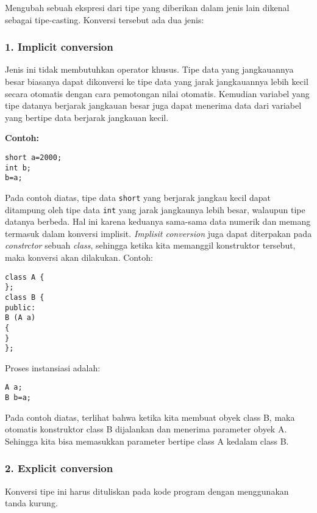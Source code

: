 Mengubah sebuah ekspresi dari tipe yang diberikan dalam jenis lain
dikenal sebagai tipe-casting. Konversi tersebut ada dua jenis:

\subsubsection{1. Implicit conversion}\label{implicit-conversion}

Jenis ini tidak membutuhkan operator khusus. Tipe data yang jangkauannya
besar biasanya dapat dikonversi ke tipe data yang jarak jangkauannya
lebih kecil secara otomatis dengan cara pemotongan nilai otomatis.
Kemudian variabel yang tipe datanya berjarak jangkauan besar juga dapat
menerima data dari variabel yang bertipe data berjarak jangkauan kecil.

\textbf{Contoh:}

\begin{verbatim}
short a=2000;
int b;
b=a;
\end{verbatim}

Pada contoh diatas, tipe data \texttt{short} yang berjarak jangkau kecil
dapat ditampung oleh tipe data \texttt{int} yang jarak jangkaunya lebih
besar, walaupun tipe datanya berbeda. Hal ini karena keduanya sama-sama
data numerik dan memang termasuk dalam konversi implisit. \emph{Implisit
conversion} juga dapat diterpakan pada \emph{constrctor} sebuah
\emph{class}, sehingga ketika kita memanggil konstruktor tersebut, maka
konversi akan dilakukan. Contoh:

\begin{verbatim}
class A {
};
class B {
public:
B (A a)
{
}
};
\end{verbatim}

Proses instansiasi adalah:

\begin{verbatim}
A a;
B b=a;
\end{verbatim}

Pada contoh diatas, terlihat bahwa ketika kita membuat obyek class B,
maka otomatis konstruktor class B dijalankan dan menerima parameter
obyek A. Sehingga kita bisa memasukkan parameter bertipe class A kedalam
class B.

\subsubsection{2. Explicit conversion}\label{explicit-conversion}

Konversi tipe ini harus dituliskan pada kode program dengan menggunakan
tanda kurung.

